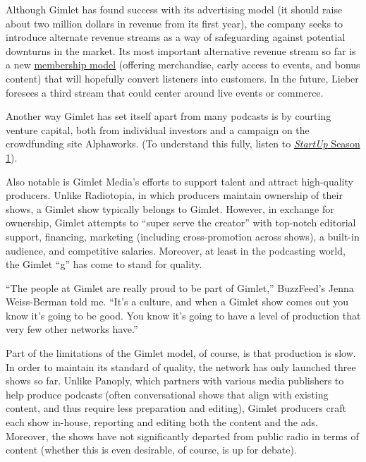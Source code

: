 \documentclass[notoc, symmetric, nobib, nols]{towcenter-guideto-book}
\begin{document}
Although Gimlet has found success with its advertising model (it should raise about two million dollars in revenue from its first year), the company seeks to introduce alternate revenue streams as a way of safeguarding against potential downturns in the market. Its most important alternative revenue stream so far is a new \href{https://gimletmedia.com/join-gimlet/}{membership model} (offering merchandise, early access to events, and bonus content) that will hopefully convert listeners into customers. In the future, Lieber foresees a third stream that could center around live events or commerce.\autocite{lieber} 

Another way Gimlet has set itself apart from many podcasts is by courting venture capital, both from individual investors and a campaign on the crowdfunding site Alphaworks. (To understand this fully, listen to \href{https://gimletmedia.com/show/startup/episodes/season/season-1/page/2/}{\textit{StartUp} Season 1}).\autocite{startup}

Also notable is Gimlet Media's efforts to support talent and attract high-quality producers. Unlike Radiotopia, in which producers maintain ownership of their shows, a Gimlet show typically belongs to Gimlet. However, in exchange for ownership, Gimlet attempts to ``super serve the creator'' with top-notch editorial support, financing, marketing (including cross-promotion across shows), a built-in audience, and competitive salaries.  Moreover, at least in the podcasting world, the Gimlet ``g'' has come to stand for quality.\autocite{lieber} 

``The people at Gimlet are really proud to be part of Gimlet,'' BuzzFeed's Jenna Weiss-Berman told me. ``It's a culture, and when a Gimlet show comes out you know it's going to be good. You know it's going to have a level of production that very few other networks have.''\autocite{wb} 

Part of the limitations of the Gimlet model, of course, is that production is slow. In order to maintain its standard of quality, the network has only launched three shows so far. Unlike Panoply, which partners with various media publishers to help produce podcasts (often conversational shows that align with existing content, and thus require less preparation and editing), Gimlet producers craft each show in-house, reporting and editing both the content and the ads. Moreover, the shows have not significantly departed from public radio in terms of content (whether this is even desirable, of course, is up for debate).
\end{document}
